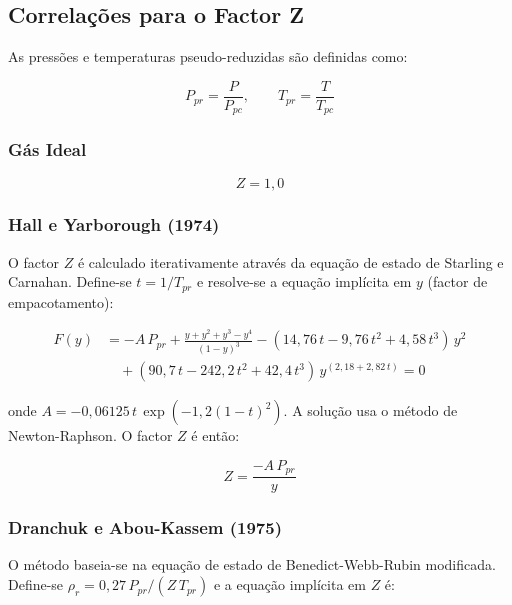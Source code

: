 \documentclass[12pt, a4paper]{article}
\begin{document}
\subsection{Correlações para o Factor Z}

As pressões e temperaturas pseudo-reduzidas são definidas como:

\begin{equation}
  P_{pr} = \frac{P}{P_{pc}}, \qquad T_{pr} = \frac{T}{T_{pc}}
\end{equation}

\subsubsection{Gás Ideal}

\begin{equation}
  Z = 1{,}0
\end{equation}

\subsubsection{Hall e Yarborough (1974)}

O factor $Z$ é calculado iterativamente através da equação de estado de Starling e
Carnahan. Define-se $t = 1/T_{pr}$ e resolve-se a equação implícita em $y$
(factor de empacotamento):

\begin{align}
  F(y) &= -A\,P_{pr}
           + \frac{y + y^2 + y^3 - y^4}{(1 - y)^3}
           - (14{,}76\,t - 9{,}76\,t^2 + 4{,}58\,t^3)\,y^2 \nonumber\\
         &\quad + (90{,}7\,t - 242{,}2\,t^2 + 42{,}4\,t^3)\,y^{(2{,}18 + 2{,}82\,t)}
           = 0 \label{eq:hy_F}
\end{align}

\noindent onde $A = -0{,}06125\,t\,\exp(-1{,}2(1-t)^2)$. A solução usa o método de
Newton-Raphson. O factor $Z$ é então:

\begin{equation}\label{eq:hy_Z}
  Z = \frac{-A\,P_{pr}}{y}
\end{equation}

\subsubsection{Dranchuk e Abou-Kassem (1975)}

O método baseia-se na equação de estado de Benedict-Webb-Rubin modificada.
Define-se $\rho_r = 0{,}27\,P_{pr}/(Z\,T_{pr})$ e a equação implícita em $Z$ é:
\end{document}
